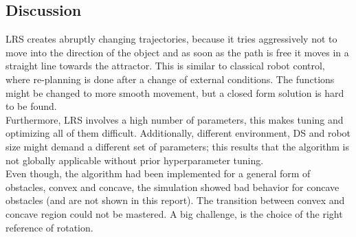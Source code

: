 \subsection{Discussion}
LRS creates abruptly changing trajectories, because it tries aggressively not to move into the direction of the object and as soon as the path is free it moves in a straight line towards the attractor. This is similar to classical robot control, where re-planning is done after a change of external conditions. The functions might be changed to more smooth movement, but a closed form solution is hard to be found. \\
Furthermore, LRS involves a high number of parameters, this makes tuning and optimizing all of them difficult. Additionally, different environment, DS and robot size might demand a different set of parameters; this results that the algorithm is not globally applicable without prior hyperparameter tuning. \\
Even though, the algorithm had been implemented for a general form of obstacles, convex and concave, the simulation showed bad behavior for concave obstacles (and are not shown in this report). The transition between convex and concave region could not be mastered. A big challenge, is the choice of the right reference of rotation. \\






